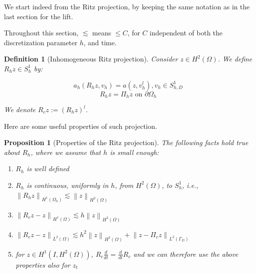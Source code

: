 \documentclass[english,a4paper,10pt,oneside]{scrbook}	%
\theoremstyle{break}
\newtheorem{defn}[equation]{Definition}
\newtheorem{prop}[equation]{Proposition}
\theoremstyle{remark}
\newcommand{\norm}[1]{\left\lVert#1\right\rVert}
\begin{document}
We start indeed from the Ritz projection, by keeping the same notation as in the last section for the lift.

Throughout this section, $\lesssim$ means $\leq C $, for $C$ independent of both the discretization parameter $h$, and time.

\begin{defn}[Inhomogeneous Ritz projection]
Consider $z \in H^2(\Omega)$. We define $R_h z \in S^1_h$ by:

$$a_h(R_h z , v_h) = a(z, v_h^l), v_h \in S^1_{h,D}$$
$$R_h z = \Pi_h z \text{ on } \partial \Omega_h$$

We denote $R_c z := (R_h z)^l$.

\end{defn}

Here are some useful properties of such projection.

\begin{prop}[Properties of the Ritz projection]
\label{prop:ritz}
The following facts hold true about $R_h$, where we assume that $h$ is small enough:

\begin{enumerate}
	\item $R_h$ is well defined
	\item $R_h$ is continuous, uniformly in $h$, from $H^2(\Omega)$, to $S^1_h$, i.e., $\norm{R_hz}_{H^1(\Omega_h)}\lesssim \norm{z}_{H^2(\Omega)}$
	\item $\norm{R_c z - z}_{H^1(\Omega)}\lesssim h\norm{z}_{H^2(\Omega)}$
	\item $\norm{R_c z - z}_{L^2(\Omega)}\lesssim h^2 \norm{z}_{H^2(\Omega)} + \norm{z-\Pi_c z}_{L^2(\Gamma_D)}$
	\item for $z \in H^1(I,H^2(\Omega))$, $R_c \frac{d}{dt} = \frac{d}{dt} R_c$ and we can therefore use the above properties also for $z_t$
\end{enumerate}

\end{prop}
\end{document}
